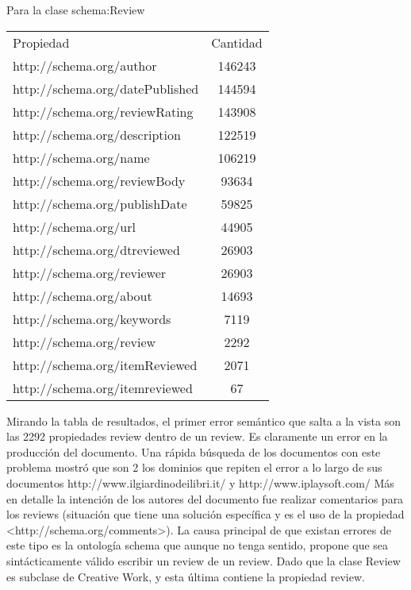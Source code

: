 Para la clase schema:Review\\
\begin{tabular}{| l | c | }
 Propiedad & Cantidad \\
 http://schema.org/author & 146243 \\
 http://schema.org/datePublished & 144594 \\
 http://schema.org/reviewRating & 143908 \\
 http://schema.org/description & 122519 \\
 http://schema.org/name & 106219 \\
 http://schema.org/reviewBody & 93634 \\
 http://schema.org/publishDate & 59825 \\
 http://schema.org/url & 44905 \\
 http://schema.org/dtreviewed & 26903 \\
 http://schema.org/reviewer & 26903 \\
 http://schema.org/about & 14693 \\
 http://schema.org/keywords & 7119 \\
 http://schema.org/review & 2292 \\
 http://schema.org/itemReviewed & 2071 \\
 http://schema.org/itemreviewed & 67 
\end{tabular}

 Mirando la tabla de resultados, el primer error semántico que salta a la vista son las 2292 propiedades review dentro de un review. 
 Es claramente un error en la producción del documento. 
 Una rápida búsqueda de los documentos con este problema mostró que son 2 los dominios que repiten el error a lo largo de sus documentos
 http://www.ilgiardinodeilibri.it/ y http://www.iplaysoft.com/
 Más en detalle la intención de los autores del documento fue realizar comentarios para los reviews (situación que tiene una solución específica 
 y es el uso de la propiedad <http://schema.org/comments>). 
 La causa principal de que existan errores de este tipo es la ontología schema que aunque no tenga sentido, propone que sea sintácticamente válido
 escribir un review de un review. Dado que la clase Review es subclase de Creative Work, y esta última contiene la propiedad review.
 
